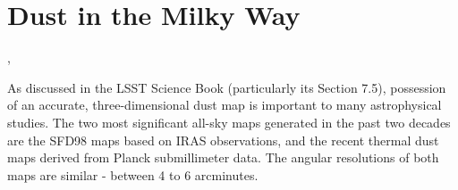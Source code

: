 %
%
%
%
%
%
%

\section{Dust in the Milky Way}
\def\secname{MW_Dust}\label{sec:\secname} %

, 


As discussed in the LSST Science Book (particularly its Section 7.5),
possession of an accurate, three-dimensional dust map is important to
many astrophysical studies. The two most significant all-sky maps
generated in the past two decades are the SFD98 maps based on IRAS
observations, and the recent thermal dust maps derived from Planck
submillimeter data. The angular resolutions of both maps are similar -
between 4 to 6 arcminutes.

